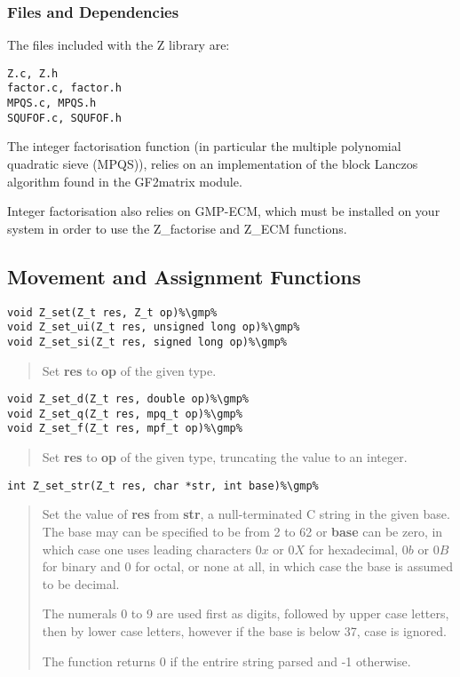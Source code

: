 \documentclass[a4paper,10pt]{article}
\newcommand{\gmp}{\hfill[GMP]}
\begin{document}
\subsubsection{Files and Dependencies}
The files included with the Z library are:

\begin{verbatim}Z.c, Z.h
factor.c, factor.h
MPQS.c, MPQS.h
SQUFOF.c, SQUFOF.h\end{verbatim}

The integer factorisation function (in particular the multiple polynomial quadratic sieve (MPQS)), relies on an implementation of the block Lanczos algorithm found in the GF2matrix module.

Integer factorisation also relies on GMP-ECM, which must be installed on your system in order to use the Z\_factorise and Z\_ECM functions.

\subsection{Movement and Assignment Functions}
\begin{lstlisting}
void Z_set(Z_t res, Z_t op)%\gmp%
void Z_set_ui(Z_t res, unsigned long op)%\gmp%
void Z_set_si(Z_t res, signed long op)%\gmp%
\end{lstlisting}
\begin{quote}Set \textbf{res} to \textbf{op} of the given type.\end{quote}

\begin{lstlisting}
void Z_set_d(Z_t res, double op)%\gmp%
void Z_set_q(Z_t res, mpq_t op)%\gmp%
void Z_set_f(Z_t res, mpf_t op)%\gmp%
\end{lstlisting}
\begin{quote}Set \textbf{res} to \textbf{op} of the given type, truncating the value to an integer.\end{quote}

\begin{lstlisting}
int Z_set_str(Z_t res, char *str, int base)%\gmp%
\end{lstlisting}
\begin{quote}Set the value of \textbf{res} from \textbf{str}, a null-terminated C string in the given base. The base may can be specified to be from 2 to 62 or \textbf{base} can be zero, in which case one uses leading characters $0x$ or $0X$ for hexadecimal, $0b$ or $0B$ for binary and $0$ for octal, or none at all, in which case the base is assumed to be decimal.

The numerals 0 to 9 are used first as digits, followed by upper case letters, then by lower case letters, however if the base is below 37, case is ignored.

The function returns 0 if the entrire string parsed and -1 otherwise.\end{quote}
\end{document}
